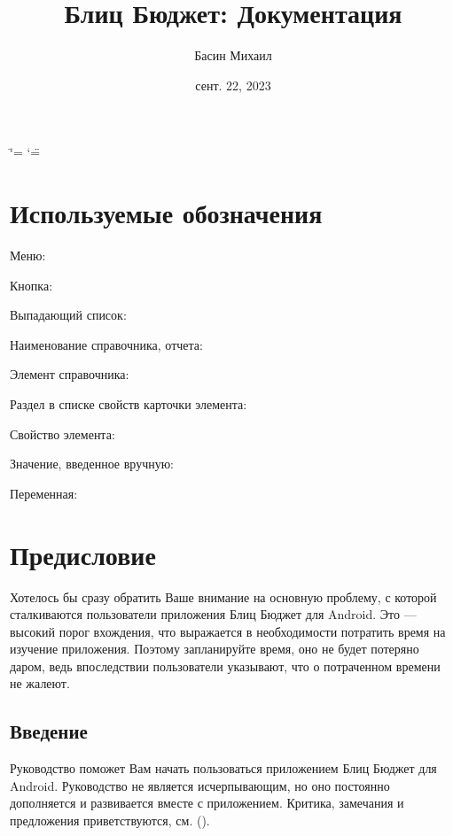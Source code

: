 \documentclass[a4paper,10pt,russian]{sphinxmanual}
\title{Блиц Бюджет: Документация}
\date{сент. 22, 2023}
\author{Басин Михаил}
\begin{document}
\ifdefined\shorthandoff
  \ifnum\catcode`\=\string=\active\shorthandoff{=}\fi
  \ifnum\catcode`\"=\active{}\fi
\fi

\pagestyle{empty}
\sphinxmaketitle
\pagestyle{plain}
\sphinxtableofcontents
\pagestyle{normal}
\label{\detokenize{index::doc}}


\sphinxstepscope


\chapter{Используемые обозначения}
\label{\detokenize{notations:id1}}\label{\detokenize{notations::doc}}
\sphinxAtStartPar
Меню: 

\sphinxAtStartPar
Кнопка: 

\sphinxAtStartPar
Выпадающий список: 

\sphinxAtStartPar
Наименование справочника, отчета: 

\sphinxAtStartPar
Элемент справочника: 

\sphinxAtStartPar
Раздел в списке свойств карточки элемента: 

\sphinxAtStartPar
Свойство элемента: 

\sphinxAtStartPar
Значение, введенное вручную:  

\sphinxAtStartPar
Переменная: 

\sphinxstepscope


\chapter{Предисловие}
\label{\detokenize{preface:id1}}\label{\detokenize{preface::doc}}
\sphinxAtStartPar
Хотелось бы сразу обратить Ваше внимание на основную проблему, с которой сталкиваются пользователи приложения Блиц Бюджет для Android. Это — высокий порог вхождения,
что выражается в необходимости потратить время на изучение приложения. Поэтому запланируйте время, оно не будет потеряно даром, ведь впоследствии
пользователи указывают, что о потраченном времени не жалеют.


\section{Введение}
\label{\detokenize{preface:id2}}
\sphinxAtStartPar
Руководство поможет Вам начать пользоваться приложением Блиц Бюджет для Android. Руководство не является исчерпывающим, но оно
постоянно дополняется и развивается вместе с приложением. Критика, замечания и предложения приветствуются,
см. {\hyperref[\detokenize{preface:id5}]{}} ().
\end{document}
